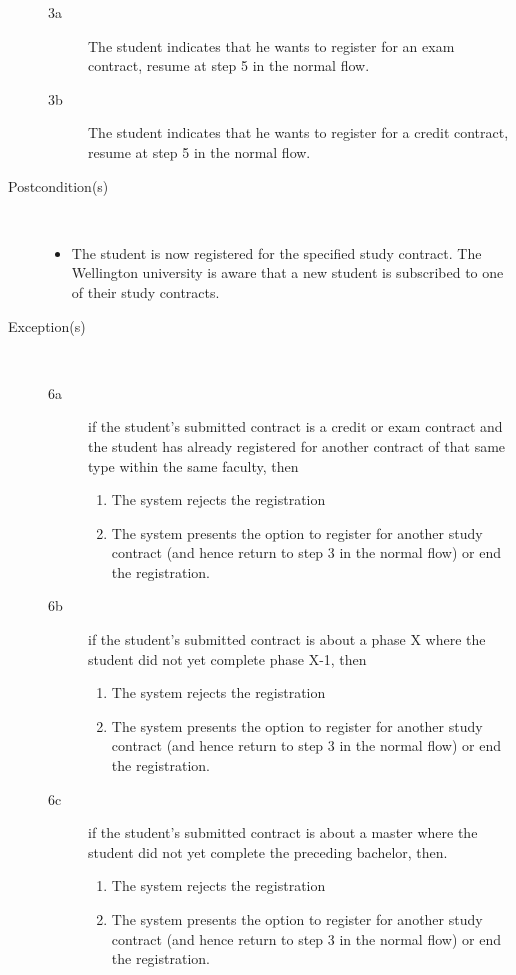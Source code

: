 \begin{description}
	\begin{description}
		\item[3a] The student indicates that he wants to register for an exam
		contract, resume at step 5 in the normal flow.
		\item[3b] The student indicates that he wants to register for a credit
		contract, resume at step 5 in the normal flow.
	\end{description}
	\item[Postcondition(s)] \ 
	\begin{itemize}
		\item The student is now registered for the specified study contract. The
		Wellington university is aware that a new student is subscribed to one of
		their study contracts.
	\end{itemize}
	\item[Exception(s)] \ 
	\begin{description}
		\item[6a] if the student's submitted contract is a credit or exam contract and
		the student has already registered for another contract of that same type
		within the same faculty, then
		\begin{enumerate}
		  \item The system rejects the registration
		  \item The system presents the option to register for another study contract
		  (and hence return to step 3 in the normal flow) or end the registration.
		\end{enumerate}
		\item[6b] if the student's submitted contract is about a phase X where the
		student did not yet complete phase X-1, then
		\begin{enumerate}
		 	\item The system rejects the registration
		 	\item The system presents the option to register for another study contract
		 	(and hence return to step 3 in the normal flow) or end the registration.
		\end{enumerate}
		\item[6c] if the student's submitted contract is about a master where the
		student did not yet complete the preceding bachelor, then.
		\begin{enumerate}
		 	\item The system rejects the registration
		 	\item The system presents the option to register for another study contract
		 	(and hence return to step 3 in the normal flow) or end the registration.
		\end{enumerate}
	\end{description}
\end{description}
